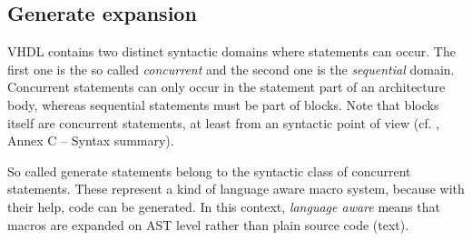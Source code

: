 \subsection{Generate expansion}
\label{sec:GenerateExpansion}

VHDL contains two distinct syntactic domains where statements can
occur. The first one is the so called \emph{concurrent} and the
second one is the \emph{sequential} domain. Concurrent statements
can only occur in the statement part of an architecture body, whereas
sequential statements must be part of  blocks. Note that
 blocks itself are concurrent statements, at least from an
syntactic point of view (cf. \cite{IEEELRM}, Annex C -- Syntax summary).

So called generate statements belong to the syntactic class of
concurrent statements. These represent a kind of language
aware macro system, because with their help, code can be generated.
In this context, \emph{language aware} means that macros are expanded
on AST level rather than plain source code (text).

